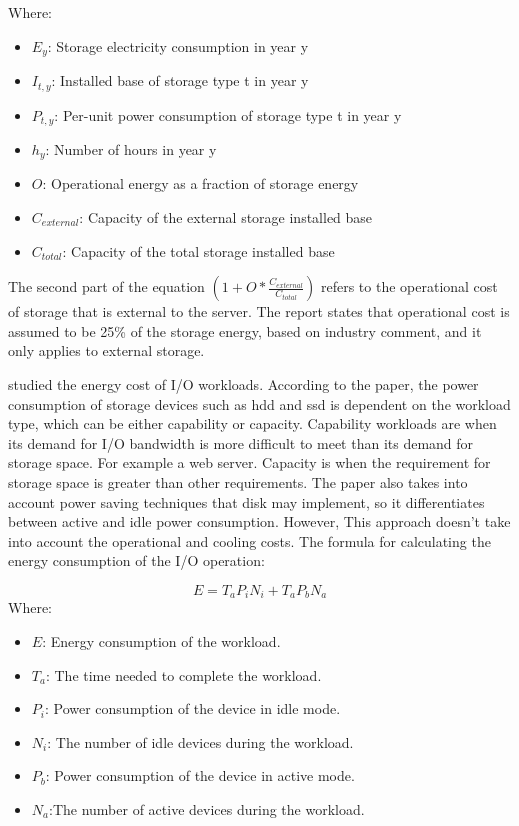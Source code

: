 Where:

\begin{itemize}
    \item $E_y$: Storage electricity consumption in year y
    \item $I_{t,y}$: Installed base of storage type t in year y
    \item $P_{t,y}$: Per-unit power consumption of storage type t in year y
    \item $h_y$: Number of hours in year y
    \item $O$: Operational energy as a fraction of storage energy
    \item $C_{external}$: Capacity of the external storage installed base
    \item $C_{total}$: Capacity of the total storage installed base
\end{itemize}

The second part of the equation $(1 + O * \frac{C_{external}}{C_{total}})$ refers to the operational cost of storage that is external to the server.
The report states that operational cost is assumed to be 25\% of the storage energy, based on industry comment, and it only applies to external storage.


\citet{Li2014} studied the energy cost of I/O workloads. According to the paper, the power consumption of storage devices such as \ac{hdd} and \ac{ssd} is dependent on the workload type, which can be either capability or capacity. Capability workloads are when its demand for I/O bandwidth is more difficult to meet than its demand for storage space. For example a web server. Capacity is when the requirement for storage space is greater than other requirements. The paper also takes into account power saving techniques that disk may implement, so it differentiates between active and idle power consumption. However, This approach doesn't take into account the operational and cooling costs.
The formula for calculating the energy consumption of the I/O operation:

\begin{equation}
    E = T_a P_i N_i + T_a P_b N_a
\end{equation}
Where:

\begin{itemize}
    \item $E$: Energy consumption of the workload.
    \item $T_a$: The time needed to complete the workload.
    \item $P_i$: Power consumption  of the device in idle mode.
    \item $N_i$: The number of idle devices during the workload.
    \item $P_b$: Power consumption of the device in active mode.
    \item $N_a$:The number of active devices during the workload.
\end{itemize}

